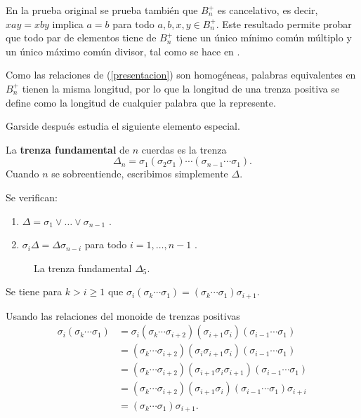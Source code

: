 \documentclass[bibtex, anon]{TEMat-article}
\begin{document}
En la prueba original se prueba también que $B_n^+$ es cancelativo, es decir, $xay=xby$ implica $a=b$ para todo $a,b,x,y\in B_n^+$. Este resultado permite probar que todo par de elementos tiene de $B_n^+$ tiene un único mínimo común múltiplo y un único máximo común divisor, tal como se hace en \cite{Dehornoy}. 

Como las relaciones de (\ref{presentacion}) son homogéneas, palabras equivalentes en $B_n^+$ tienen la misma longitud, por lo que la longitud de una trenza positiva se define como la longitud de cualquier palabra que la represente.  



Garside después estudia el siguiente elemento especial.
\begin{definicion}
	La \textbf{trenza fundamental} de $n$ cuerdas es la trenza
	$$\Delta_n=\sigma_1(\sigma_2\sigma_1)\cdots(\sigma_{n-1}\cdots\sigma_1).$$
	Cuando $n$ se sobreentiende, escribimos simplemente $\Delta$. 
\end{definicion} 


\begin{proposicion}\label{conjuga}
	Se verifican: 
	\begin{enumerate}
		\item $\Delta=\sigma_1\lor\dots\lor\sigma_{n-1}$ \cite[Lema 1]{Garside}.
		\item $\sigma_i\Delta=\Delta\sigma_{n-i}$ para todo $i=1,\dots, n-1$ \cite[Lema 4]{Garside}.
	\end{enumerate}
\end{proposicion} 


\begin{figure}[h!]
	\centering
	\caption{La trenza fundamental $\Delta_5$.}
\end{figure}

\begin{lema}\label{anterior}
Se tiene para $k>i\geq 1$ que $\sigma_i(\sigma_k\cdots\sigma_1)=(\sigma_k\cdots\sigma_1)\sigma_{i+1}$.
\end{lema}
\begin{demostracion}
Usando las relaciones del monoide de trenzas positivas
		\begin{align*}
		\sigma_i(\sigma_k\cdots\sigma_1)&=\sigma_i(\sigma_k\cdots\sigma_{i+2})(\sigma_{i+1}\sigma_i)(\sigma_{i-1}\cdots\sigma_1)\\
		&=(\sigma_k\cdots\sigma_{i+2})(\sigma_i\sigma_{i+1}\sigma_i)(\sigma_{i-1}\cdots\sigma_1)\\
		&=(\sigma_k\cdots\sigma_{i+2})(\sigma_{i+1}\sigma_i\sigma_{i+1})(\sigma_{i-1}\cdots\sigma_1)\\
		&=(\sigma_k\cdots\sigma_{i+2})(\sigma_{i+1}\sigma_i)(\sigma_{i-1}\cdots\sigma_1)\sigma_{i+i}\\
		&=(\sigma_k\cdots\sigma_1)\sigma_{i+1}.
		\end{align*}
\end{demostracion}
\end{document}
